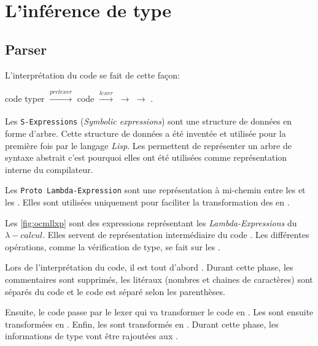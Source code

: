\chapter{L'inférence de type}
    \section{Parser}

            L'interprétation du code se fait de cette façon:

        \begin{center}
            code typer $\xrightarrow[]{prelexer}$ code  $\xrightarrow[]{lexer}$ \sexp{} $\xrightarrow[]{}$ \pexp{} $\xrightarrow[]{}$ \lexp.\\
        \end{center}

            Les \texttt{S-Expressions} (\textit{Symbolic expressions}) sont une structure de données en forme d'arbre.
            Cette structure de données a été inventée et utilisée pour la première fois par le langage \textit{Lisp}.
            Les \sexp{} permettent de représenter un arbre de syntaxe abstrait c'est pourquoi elles ont été utilisées
            comme représentation interne du compilateur.

            Les \texttt{Proto Lambda-Expression} sont une représentation à mi-chemin entre les \sexp{} et les \lexp{}.
            Elles sont utilisées uniquement pour faciliter la transformation des \sexp{} en \lexp{}.

            Les \lexp{}\ref{fig:ocmllxp} sont des expressions représentant les \textit{Lambda-Expressions} du $\lambda{}-calcul$.
            Elles servent de représentation intermédiaire du code \typer{}.
            Les différentes opérations, comme la vérification de type, se fait sur les \lexp{}.

            Lors de l'interprétation du code, il est tout d'abord .
            Durant cette phase, les commentaires sont supprimés, les litéraux (nombres et chaines de caractères)
            sont séparés du code et le code est séparé selon les parenthèses.

            Ensuite, le code  passe par le lexer qui va transformer le code en \sexp{}.
            Les \sexp{} sont ensuite transformées en \pexp{}.
            Enfin, les \pexp{} sont transformés en \lexp{}. Durant cette phase, les informations de type vont être rajoutées aux \lexp{}.


